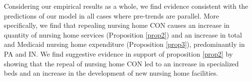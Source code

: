 \documentclass[../Main.tex]{subfiles}
\begin{document}
\indent Considering our empirical results as a whole, we find evidence consistent with the predictions of our model in all cases where pre-trends are parallel. More specifically, we find that repealing nursing home CON causes an increase in quantity of nursing home services (Proposition \ref{prop2}) and an increase in total and Medicaid nursing home expenditure (Proposition \ref{prop3}), predominantly in PA and IN. We find suggestive evidence in support of proposition \ref{prop2} by showing that the repeal of nursing home CON led to an increase in specialized beds and an increase in the development of new nursing home facilities.
\end{document}
